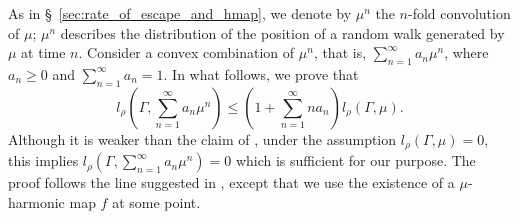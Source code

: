 \documentclass[12pt]{amsart}
\numberwithin{equation}{section}
\theoremstyle{plain}
\theoremstyle{definition}
\theoremstyle{remark}
\begin{document}
As in \S~\ref{sec:rate_of_escape_and_hmap}, we denote by $\mu^n$ the
$n$-fold convolution of $\mu$; $\mu^n$ describes the distribution of the
position of a random walk generated by $\mu$ at time $n$.  
Consider a convex combination of $\mu^n$, that is, 
$\sum_{n=1}^{\infty} a_n\mu^n$, where $a_n\geq 0$ and
$\sum_{n=1}^{\infty}a_n=1$. In what follows,  we prove that
\begin{equation}
\label{eq:conv_comb}
 l_{\rho}\left(\Gamma, \sum_{n=1}^{\infty}a_n\mu^n \right)
 \leq \left(1+\sum_{n=1}^{\infty} n a_n\right) l_{\rho}(\Gamma,\mu). 
\end{equation}
Although it is weaker than the claim of \cite[Theorem 4.5]{forghani}, 
under the assumption $l_{\rho}(\Gamma,\mu)=0$,
this implies $l_{\rho}(\Gamma,\sum_{n=1}^{\infty}a_n\mu^n)=0$ 
which is sufficient for our purpose. 
The proof follows the line suggested in \cite{forghani}, except 
that we use the existence of a $\mu$-harmonic map $f$ at some point. 
\end{document}
